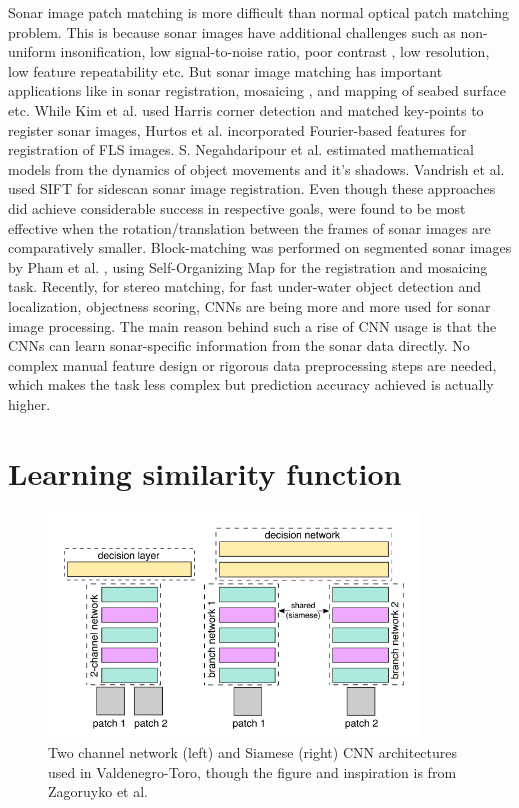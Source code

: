 Sonar image patch matching is more difficult than normal optical patch matching problem. This is because sonar images have additional challenges such as non-uniform insonification, low signal-to-noise ratio, poor contrast \cite{emberton2018underwater}, low resolution,
low feature repeatability \cite{hurtos2013automatic} etc. But sonar image matching has important applications like in sonar registration, mosaicing \cite{kim2005mosaicing}, \cite{hurtos2012fourier} and mapping of seabed surface \cite{negahdaripour2011dynamic} etc. 
While Kim et al. \cite{kim2005mosaicing} used Harris corner detection and matched key-points to register sonar images, Hurtos et al. \cite{hurtos2012fourier} incorporated Fourier-based features for registration of FLS images. S. Negahdaripour
et al. \cite{negahdaripour2011dynamic} estimated mathematical models from the dynamics of object movements and it's shadows. Vandrish et al. \cite{vandrish2011side} used SIFT \cite{lowe2004distinctive} for sidescan sonar image registration.
Even though these approaches did achieve considerable success in respective goals, were found to be most effective when the rotation/translation between the frames of sonar images are comparatively smaller. Block-matching was performed on segmented sonar images by Pham et al. \cite{pham2013guided}, using Self-Organizing Map for the registration and mosaicing task. Recently, \cite{zbontar2016stereo} for stereo matching, \cite{kim2016convolutional}
for fast under-water object detection and localization, \cite{valdenegro2016objectness} objectness scoring, CNNs are being more and more used for sonar image processing. The main reason behind such a rise of CNN usage is that the CNNs can learn sonar-specific information from the sonar data directly. No complex manual feature design or rigorous data preprocessing steps are needed, which makes the task less complex but prediction accuracy achieved is actually higher.


\section{Learning similarity function}

\begin{figure}[htb]
\centering
\includegraphics[height=6cm]{images/densenet/two_channel_only_siamese.png}
\caption{Two channel network (left) and Siamese (right) CNN architectures used in Valdenegro-Toro, though the figure and inspiration is from Zagoruyko et al.\cite{zagoruyko2015learning}}
\label{fig:two_channel_only_siamese}
\end{figure}


